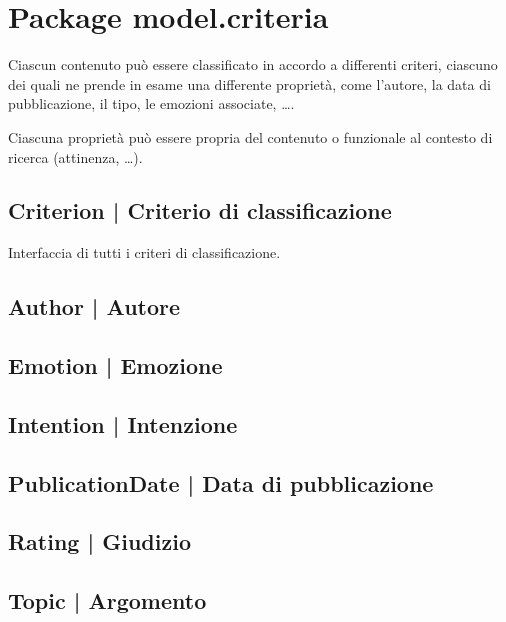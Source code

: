 \documentclass[10pt,a4paper,headinclude,footinclude,hidelinks]{scrreprt} %
\begin{document}
	\section{Package model.criteria}
	\label{sec:stage:design:sistema:model.criteria}
	Ciascun contenuto può essere classificato in accordo a differenti criteri, ciascuno dei quali ne prende in esame una differente proprietà, come l'autore, la data di pubblicazione, il tipo, le emozioni associate, \ldots .

	Ciascuna proprietà può essere propria del contenuto o funzionale al contesto di ricerca (attinenza, \ldots).

	\subsection[Criterion]{Criterion | Criterio di classificazione}
	\label{sec:stage:design:sistema:model.criteria:criteria}
	Interfaccia di tutti i criteri di classificazione.

	\subsection[Author]{Author | Autore}
	\label{sec:stage:design:sistema:model.criteria:author}

	\subsection[Emotion]{Emotion | Emozione}
	\label{sec:stage:design:sistema:model.criteria:emotion}

	\subsection[Intention]{Intention | Intenzione}
	\label{sec:stage:design:sistema:model.criteria:intention}

	\subsection[PublicationDate]{PublicationDate | Data di pubblicazione}
	\label{sec:stage:design:sistema:model.criteria:publication-date}

	\subsection[Rating]{Rating | Giudizio}
	\label{sec:stage:design:sistema:model.criteria:rating}

	\subsection[Topic]{Topic | Argomento}
	\label{sec:stage:design:sistema:model.criteria:topic}
\end{document}
